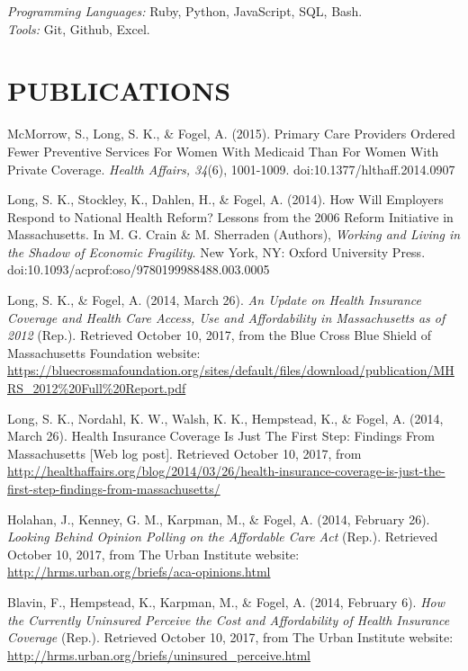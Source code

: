\documentclass[margin, 10pt]{res} %
\begin{document}
\begin{resume}
{\sl Programming Languages:} Ruby, Python, JavaScript, SQL, Bash. \\
{\sl Tools:} Git, Github, Excel. \\

\section{\small\bf PUBLICATIONS}
McMorrow, S., Long, S. K., \& Fogel, A. (2015). Primary Care Providers Ordered Fewer Preventive Services For Women With Medicaid Than For Women With Private Coverage. {\sl Health Affairs, 34}(6), 1001-1009. doi:10.1377/hlthaff.2014.0907

Long, S. K., Stockley, K., Dahlen, H., \& Fogel, A. (2014). How Will Employers Respond to National Health Reform? Lessons from the 2006 Reform Initiative in Massachusetts. In M. G. Crain \& M. Sherraden (Authors), {\sl Working and Living in the Shadow of Economic Fragility}. New York, NY: Oxford University Press. doi:10.1093/acprof:oso/9780199988488.003.0005

Long, S. K., \& Fogel, A. (2014, March 26). {\sl An Update on Health Insurance Coverage and Health Care Access, Use and Affordability in Massachusetts as of 2012} (Rep.). Retrieved October 10, 2017, from the Blue Cross Blue Shield of Massachusetts Foundation website: \url{https://bluecrossmafoundation.org/sites/default/files/download/publication/MHRS_2012%20Full%20Report.pdf}

Long, S. K., Nordahl, K. W., Walsh, K. K., Hempstead, K., \& Fogel, A. (2014, March 26). Health Insurance Coverage Is Just The First Step: Findings From Massachusetts [Web log post]. Retrieved October 10, 2017, from \url{http://healthaffairs.org/blog/2014/03/26/health-insurance-coverage-is-just-the-first-step-findings-from-massachusetts/}

Holahan, J., Kenney, G. M., Karpman, M., \& Fogel, A. (2014, February 26). {\sl Looking Behind Opinion Polling on the Affordable Care Act} (Rep.). Retrieved October 10, 2017, from The Urban Institute website: \url{http://hrms.urban.org/briefs/aca-opinions.html}

Blavin, F., Hempstead, K., Karpman, M., \& Fogel, A. (2014, February 6). {\sl How the Currently Uninsured Perceive the Cost and Affordability of Health Insurance Coverage} (Rep.). Retrieved October 10, 2017, from The Urban Institute website: \url{http://hrms.urban.org/briefs/uninsured_perceive.html}


\end{resume}
\end{document}
